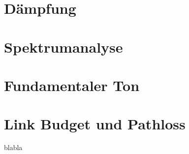 \section{Dämpfung}
\section{Spektrumanalyse}
\section{Fundamentaler Ton}
\section{Link Budget und Pathloss}
blabla
\clearpage